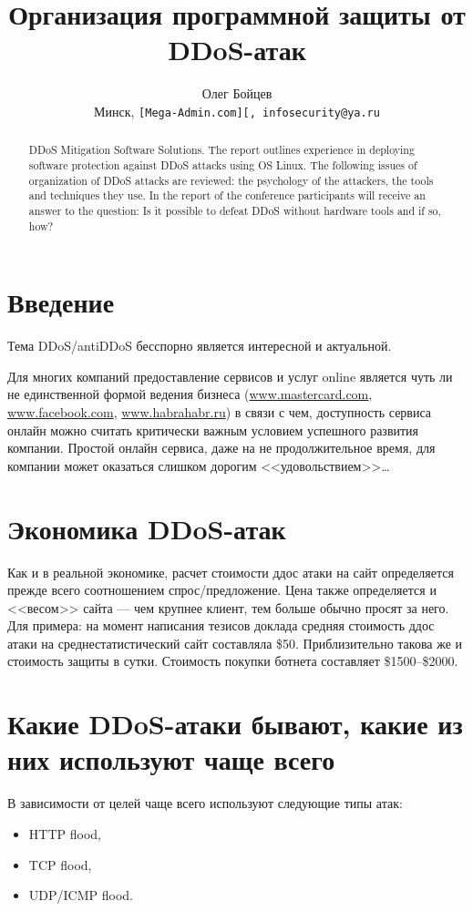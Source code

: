 \documentclass[10pt, a5paper]{article}
\begin{document}
\title{Организация программной защиты от DDoS-атак }

\author{Олег Бойцев\\
\small Минск, \texttt{[Mega-Admin.com][, infosecurity@ya.ru}
}
\maketitle

\begin{abstract}
DDoS Mitigation Software Solutions. The report outlines experience in deploying software protection against DDoS attacks using OS Linux. The following  issues of organization of DDoS attacks are reviewed: the psychology of the attackers, the tools and techniques they use. In the report of the conference participants will receive an answer to the question: Is it possible to defeat DDoS without hardware tools and if so, how?
\end{abstract}

\section*{Введение}
Тема DDoS/antiDDoS бесспорно является интересной и актуальной. 

Для многих компаний предоставление сервисов и услуг  online является чуть ли не единственной формой ведения бизнеса (\url{www.mastercard.com}, \url{www.facebook.com}, \url{www.habrahabr.ru}) в связи с чем, доступность сервиса онлайн можно считать критически важным условием успешного развития компании. Простой онлайн сервиса, даже на не продолжительное время, для компании может оказаться слишком дорогим <<удовольствием>>\ldots

\section*{Экономика DDoS-атак}
Как и в реальной экономике, расчет стоимости ддос атаки на сайт определяется прежде всего соотношением спрос/предложение. Цена также определяется и <<весом>> сайта --- чем крупнее клиент, тем больше обычно просят за него.
Для примера: на момент написания тезисов доклада средняя стоимость ддос атаки на среднестатистический сайт составляла \$50. Приблизительно такова же и стоимость защиты в сутки. Стоимость покупки ботнета составляет \$1500--\$2000.

\section*{Какие DDoS-атаки бывают, какие из них используют чаще всего}
В зависимости от целей  чаще всего используют следующие типы атак:  
\begin{itemize}
\item HTTP flood,
\item TCP flood,
\item UDP/ICMP flood.
\end{itemize}
\end{document}

